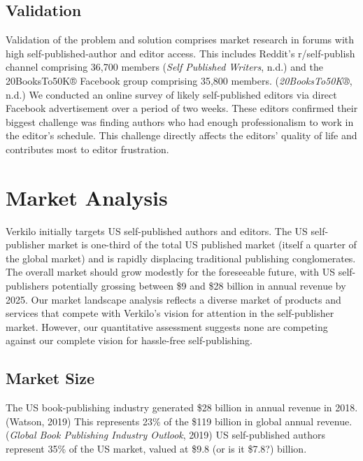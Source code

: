 \documentclass[10pt,openany]{book}
\begin{document}
\hypertarget{validation}{%
\section{Validation}\label{validation}}

Validation of the problem and solution comprises market research in
forums with high self-published-author and editor access. This includes
Reddit's r/self-publish channel comprising 36,700 members (\emph{Self
Published Writers}, n.d.) and the 20BooksTo50K® Facebook group
comprising 35,800 members. (\emph{20BooksTo50K®}, n.d.) We conducted an
online survey of likely self-published editors via direct Facebook
advertisement over a period of two weeks. These editors confirmed their
biggest challenge was finding authors who had enough professionalism to
work in the editor's schedule. This challenge directly affects the
editors' quality of life and contributes most to editor frustration.

\hypertarget{market-analysis}{%
\chapter{Market Analysis}\label{market-analysis}}

Verkilo initially targets US self-published authors and editors. The US
self-publisher market is one-third of the total US published market
(itself a quarter of the global market) and is rapidly displacing
traditional publishing conglomerates. The overall market should grow
modestly for the foreseeable future, with US self-publishers potentially
grossing between \$9 and \$28 billion in annual revenue by 2025. Our
market landscape analysis reflects a diverse market of products and
services that compete with Verkilo's vision for attention in the
self-publisher market. However, our quantitative assessment suggests
none are competing against our complete vision for hassle-free
self-publishing.

\hypertarget{market-size}{%
\section{Market Size}\label{market-size}}

The US book-publishing industry generated \$28 billion in annual revenue
in 2018. (Watson, 2019) This represents 23\% of the \$119 billion in
global annual revenue. (\emph{Global Book Publishing Industry Outlook},
2019) US self-published authors represent 35\% of the US market, valued
at \$9.8 (or is it \$7.8?) billion.
\end{document}
